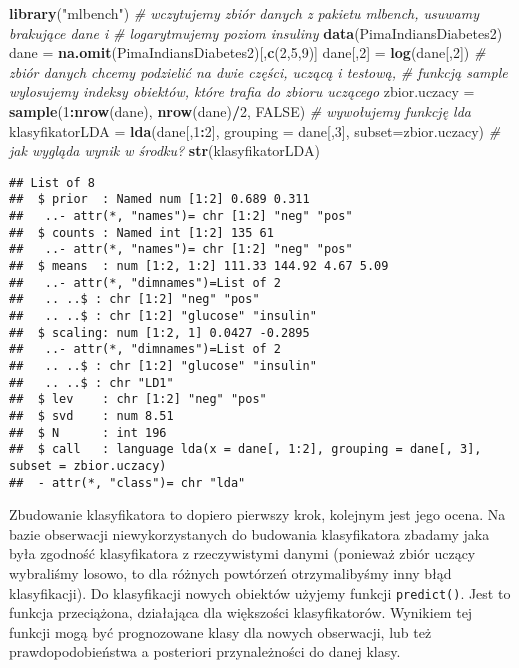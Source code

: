 \documentclass[polish,]{book}
\newenvironment{Shaded}{\begin{snugshade}}{\end{snugshade}}
\newcommand{\CommentTok}[1]{\textcolor[rgb]{0.56,0.35,0.01}{\textit{#1}}}
\newcommand{\DataTypeTok}[1]{\textcolor[rgb]{0.13,0.29,0.53}{#1}}
\newcommand{\DecValTok}[1]{\textcolor[rgb]{0.00,0.00,0.81}{#1}}
\newcommand{\KeywordTok}[1]{\textcolor[rgb]{0.13,0.29,0.53}{\textbf{#1}}}
\newcommand{\NormalTok}[1]{#1}
\newcommand{\OperatorTok}[1]{\textcolor[rgb]{0.81,0.36,0.00}{\textbf{#1}}}
\newcommand{\OtherTok}[1]{\textcolor[rgb]{0.56,0.35,0.01}{#1}}
\newcommand{\StringTok}[1]{\textcolor[rgb]{0.31,0.60,0.02}{#1}}
\begin{document}
\begin{Shaded}
\begin{Highlighting}[]
\KeywordTok{library}\NormalTok{(}\StringTok{"mlbench"}\NormalTok{)}
\CommentTok{# wczytujemy zbiór danych z pakietu mlbench, usuwamy brakujące dane i}
\CommentTok{# logarytmujemy poziom insuliny}
\KeywordTok{data}\NormalTok{(PimaIndiansDiabetes2)}
\NormalTok{dane =}\StringTok{ }\KeywordTok{na.omit}\NormalTok{(PimaIndiansDiabetes2)[,}\KeywordTok{c}\NormalTok{(}\DecValTok{2}\NormalTok{,}\DecValTok{5}\NormalTok{,}\DecValTok{9}\NormalTok{)]}
\NormalTok{dane[,}\DecValTok{2}\NormalTok{] =}\StringTok{ }\KeywordTok{log}\NormalTok{(dane[,}\DecValTok{2}\NormalTok{])}
\CommentTok{# zbiór danych chcemy podzielić na dwie części, uczącą i testową,}
\CommentTok{# funkcją sample wylosujemy indeksy obiektów, które trafia do zbioru uczącego}
\NormalTok{zbior.uczacy =}\StringTok{ }\KeywordTok{sample}\NormalTok{(}\DecValTok{1}\OperatorTok{:}\KeywordTok{nrow}\NormalTok{(dane), }\KeywordTok{nrow}\NormalTok{(dane)}\OperatorTok{/}\DecValTok{2}\NormalTok{, }\OtherTok{FALSE}\NormalTok{)}
\CommentTok{# wywołujemy funkcję lda}
\NormalTok{klasyfikatorLDA =}\StringTok{ }\KeywordTok{lda}\NormalTok{(dane[,}\DecValTok{1}\OperatorTok{:}\DecValTok{2}\NormalTok{], }\DataTypeTok{grouping =}\NormalTok{ dane[,}\DecValTok{3}\NormalTok{], }\DataTypeTok{subset=}\NormalTok{zbior.uczacy)}
\CommentTok{# jak wygląda wynik w środku?}
\KeywordTok{str}\NormalTok{(klasyfikatorLDA)}
\end{Highlighting}
\end{Shaded}

\begin{verbatim}
## List of 8
##  $ prior  : Named num [1:2] 0.689 0.311
##   ..- attr(*, "names")= chr [1:2] "neg" "pos"
##  $ counts : Named int [1:2] 135 61
##   ..- attr(*, "names")= chr [1:2] "neg" "pos"
##  $ means  : num [1:2, 1:2] 111.33 144.92 4.67 5.09
##   ..- attr(*, "dimnames")=List of 2
##   .. ..$ : chr [1:2] "neg" "pos"
##   .. ..$ : chr [1:2] "glucose" "insulin"
##  $ scaling: num [1:2, 1] 0.0427 -0.2895
##   ..- attr(*, "dimnames")=List of 2
##   .. ..$ : chr [1:2] "glucose" "insulin"
##   .. ..$ : chr "LD1"
##  $ lev    : chr [1:2] "neg" "pos"
##  $ svd    : num 8.51
##  $ N      : int 196
##  $ call   : language lda(x = dane[, 1:2], grouping = dane[, 3], subset = zbior.uczacy)
##  - attr(*, "class")= chr "lda"
\end{verbatim}

Zbudowanie klasyfikatora to dopiero pierwszy krok, kolejnym jest jego ocena.
Na bazie obserwacji niewykorzystanych do budowania klasyfikatora zbadamy jaka
była zgodność klasyfikatora z rzeczywistymi danymi (ponieważ zbiór uczący wybraliśmy losowo, to dla różnych powtórzeń otrzymalibyśmy inny błąd klasyfikacji).
Do klasyfikacji nowych obiektów użyjemy funkcji \texttt{predict()}. Jest to funkcja przeciążona, działająca dla większości klasyfikatorów. Wynikiem tej funkcji mogą być
prognozowane klasy dla nowych obserwacji, lub też prawdopodobieństwa a posteriori przynależności do danej klasy.
\end{document}
